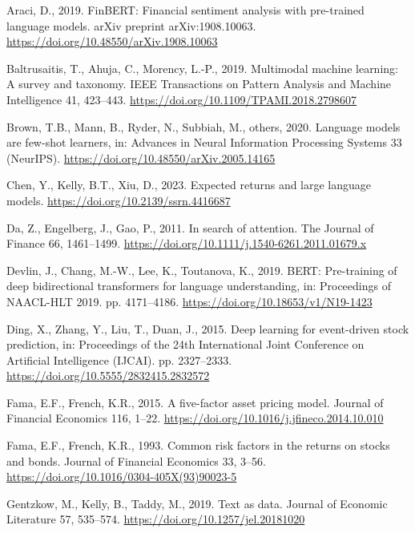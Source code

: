 \documentclass[
  11pt,
  a4paper,
]{article}
\newlength{\cslhangindent}
\newenvironment{CSLReferences}[2] %
 {\begin{list}{}{%
  \setlength{\itemindent}{0pt}
  \setlength{\leftmargin}{0pt}
  \setlength{\parsep}{0pt}
  \ifodd #1
   \setlength{\leftmargin}{\cslhangindent}
   \setlength{\itemindent}{-1\cslhangindent}
  \fi
  \setlength{\itemsep}{#2\baselineskip}}}
 {\end{list}}
\begin{document}
\label{refs}
\begin{CSLReferences}{1}{0}
Araci, D., 2019. {FinBERT}: Financial sentiment analysis with
pre-trained language models. arXiv preprint arXiv:1908.10063.
\url{https://doi.org/10.48550/arXiv.1908.10063}

Baltrusaitis, T., Ahuja, C., Morency, L.-P., 2019. Multimodal machine
learning: A survey and taxonomy. IEEE Transactions on Pattern Analysis
and Machine Intelligence 41, 423--443.
\url{https://doi.org/10.1109/TPAMI.2018.2798607}

Brown, T.B., Mann, B., Ryder, N., Subbiah, M., others, 2020. Language
models are few-shot learners, in: Advances in Neural Information
Processing Systems 33 (NeurIPS).
\url{https://doi.org/10.48550/arXiv.2005.14165}

Chen, Y., Kelly, B.T., Xiu, D., 2023. Expected returns and large
language models. \url{https://doi.org/10.2139/ssrn.4416687}

Da, Z., Engelberg, J., Gao, P., 2011. In search of attention. The
Journal of Finance 66, 1461--1499.
\url{https://doi.org/10.1111/j.1540-6261.2011.01679.x}

Devlin, J., Chang, M.-W., Lee, K., Toutanova, K., 2019. {BERT}:
Pre-training of deep bidirectional transformers for language
understanding, in: Proceedings of NAACL-HLT 2019. pp. 4171--4186.
\url{https://doi.org/10.18653/v1/N19-1423}

Ding, X., Zhang, Y., Liu, T., Duan, J., 2015. Deep learning for
event-driven stock prediction, in: Proceedings of the 24th International
Joint Conference on Artificial Intelligence (IJCAI). pp. 2327--2333.
\url{https://doi.org/10.5555/2832415.2832572}

Fama, E.F., French, K.R., 2015. A five-factor asset pricing model.
Journal of Financial Economics 116, 1--22.
\url{https://doi.org/10.1016/j.jfineco.2014.10.010}

Fama, E.F., French, K.R., 1993. Common risk factors in the returns on
stocks and bonds. Journal of Financial Economics 33, 3--56.
\url{https://doi.org/10.1016/0304-405X(93)90023-5}

Gentzkow, M., Kelly, B., Taddy, M., 2019. Text as data. Journal of
Economic Literature 57, 535--574.
\url{https://doi.org/10.1257/jel.20181020}


\end{CSLReferences}
\end{document}
